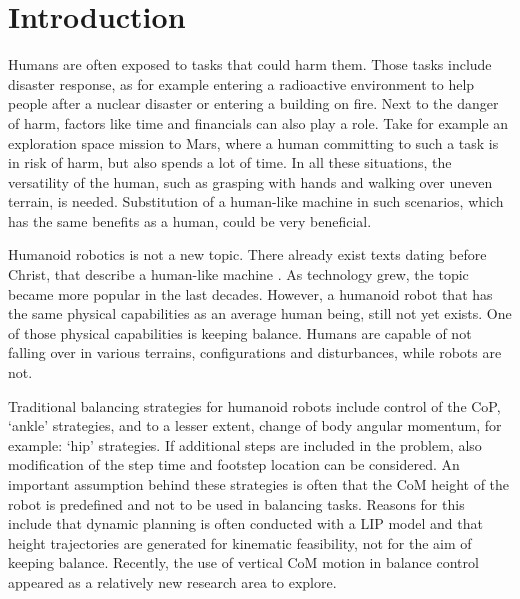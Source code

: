 %
\chapter{Introduction} \label{chap::intro}
Humans are often exposed to tasks that could harm them. Those tasks include disaster response, as for example entering a radioactive environment to help people after a nuclear disaster or entering a building on fire. Next to the danger of harm, factors like time and financials can also play a role. Take for example an exploration space mission to Mars, where a human committing to such a task is in risk of harm, but also spends a lot of time. In all these situations, the versatility of the human, such as grasping with hands and walking over uneven terrain, is needed. Substitution of a human-like machine in such scenarios, which has the same benefits as a human, could be very beneficial. 

Humanoid robotics is not a new topic. There already exist texts dating before Christ, that describe a human-like machine \cite{behnke2008humanoid}. As technology grew, the topic became more popular in the last decades. However, a humanoid robot that has the same physical capabilities as an average human being, still not yet exists. One of those physical capabilities is keeping balance. Humans are capable of not falling over in various terrains, configurations and disturbances, while robots are not. 

Traditional balancing strategies for humanoid robots include control of the \ac{CoP}, `ankle' strategies, and to a lesser extent, change of body angular momentum, for example: `hip' strategies. If additional steps are included in the problem, also modification of the step time and footstep location can be considered. An important assumption behind these strategies is often that the \ac{CoM} height of the robot is predefined and not to be used in balancing tasks. Reasons for this include that dynamic planning is often conducted with a \ac{LIP} model and that height trajectories are generated for kinematic feasibility, not for the aim of keeping balance. Recently, the use of vertical \ac{CoM} motion in balance control appeared as a relatively new research area to explore.


